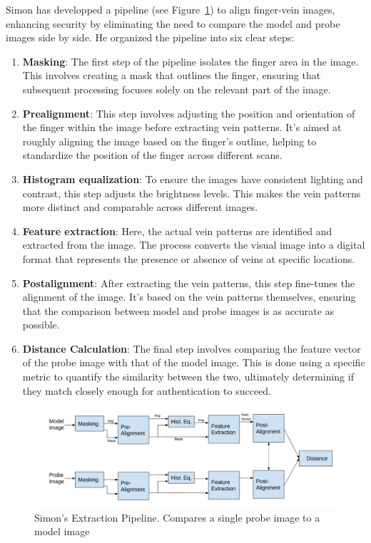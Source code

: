 Simon has developped a pipeline (see Figure~\ref{pipeline_simon}) to align finger-vein images, enhancing security by eliminating the need to compare the model and probe images side by side. He organized the pipeline into six clear steps:

\begin{enumerate}
    \item \textbf{Masking}: The first step of the pipeline isolates the finger area in the image. This involves creating a mask that outlines the finger, ensuring that subsequent processing focuses solely on the relevant part of the image.

    \item \textbf{Prealignment}: This step involves adjusting the position and orientation of the finger within the image before extracting vein patterns. It's aimed at roughly aligning the image based on the finger's outline, helping to standardize the position of the finger across different scans.

    \item \textbf{Histogram equalization}: To ensure the images have consistent lighting and contrast, this step adjusts the brightness levels. This makes the vein patterns more distinct and comparable across different images.

    \item \textbf{Feature extraction}: Here, the actual vein patterns are identified and extracted from the image. The process converts the visual image into a digital format that represents the presence or absence of veins at specific locations.

    \item \textbf{Postalignment}: After extracting the vein patterns, this step fine-tunes the alignment of the image. It's based on the vein patterns themselves, ensuring that the comparison between model and probe images is as accurate as possible.

    \item \textbf{Distance Calculation}: The final step involves comparing the feature vector of the probe image with that of the model image. This is done using a specific metric to quantify the similarity between the two, ultimately determining if they match closely enough for authentication to succeed.
\end{enumerate} 

\begin{figure}[!h]
    \centering
    \includegraphics[width=1\linewidth]{latex-img/pipeline_simon.png}
    \caption{Simon's Extraction Pipeline. Compares a single probe image to a model image}
    \label{pipeline_simon}
\end{figure}


